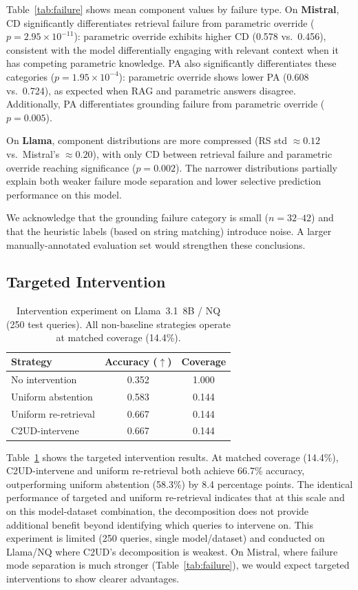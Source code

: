 \documentclass{article}
\newcommand{\ours}{\textsc{C2UD}}
\begin{document}
Table~\ref{tab:failure} shows mean component values by failure type.
On \textbf{Mistral}, CD significantly differentiates retrieval failure from parametric override ($p = 2.95 \times 10^{-11}$): parametric override exhibits higher CD (0.578 vs.\ 0.456), consistent with the model differentially engaging with relevant context when it has competing parametric knowledge.
PA also significantly differentiates these categories ($p = 1.95 \times 10^{-4}$): parametric override shows lower PA (0.608 vs.\ 0.724), as expected when RAG and parametric answers disagree.
Additionally, PA differentiates grounding failure from parametric override ($p = 0.005$).

On \textbf{Llama}, component distributions are more compressed (RS std $\approx 0.12$ vs.\ Mistral's $\approx 0.20$), with only CD between retrieval failure and parametric override reaching significance ($p = 0.002$).
The narrower distributions partially explain both weaker failure mode separation and lower selective prediction performance on this model.

We acknowledge that the grounding failure category is small ($n = 32$--$42$) and that the heuristic labels (based on string matching) introduce noise.
A larger manually-annotated evaluation set would strengthen these conclusions.

\subsection{Targeted Intervention}

\begin{table}[t]
\caption{Intervention experiment on Llama~3.1~8B / NQ (250 test queries). All non-baseline strategies operate at matched coverage (14.4\%).}
\label{tab:intervention}
\centering
\begin{tabular}{lcc}
\toprule
Strategy & Accuracy ($\uparrow$) & Coverage \\
\midrule
No intervention & 0.352 & 1.000 \\
Uniform abstention & 0.583 & 0.144 \\
Uniform re-retrieval & 0.667 & 0.144 \\
\ours{}-intervene & 0.667 & 0.144 \\
\bottomrule
\end{tabular}
\end{table}

Table~\ref{tab:intervention} shows the targeted intervention results.
At matched coverage (14.4\%), \ours{}-intervene and uniform re-retrieval both achieve 66.7\% accuracy, outperforming uniform abstention (58.3\%) by 8.4 percentage points.
The identical performance of targeted and uniform re-retrieval indicates that at this scale and on this model-dataset combination, the decomposition does not provide additional benefit beyond identifying which queries to intervene on.
This experiment is limited (250 queries, single model/dataset) and conducted on Llama/NQ where \ours{}'s decomposition is weakest.
On Mistral, where failure mode separation is much stronger (Table~\ref{tab:failure}), we would expect targeted interventions to show clearer advantages.
\end{document}

